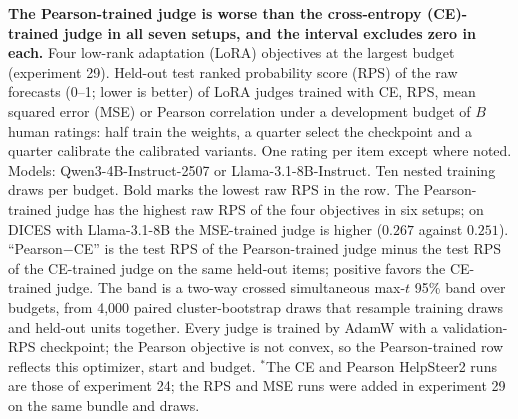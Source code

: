 \begin{table}[t]
\caption{\textbf{The Pearson-trained judge is worse than the cross-entropy (CE)-trained judge in all seven setups, and the interval excludes zero in each.}
Four low-rank adaptation (LoRA) objectives at the largest budget (experiment 29).
Held-out test ranked probability score (RPS) of the raw forecasts (0--1; lower is better) of LoRA judges trained with CE, RPS, mean squared error (MSE) or Pearson correlation under a development budget of $B$ human ratings: half train the weights, a quarter select the checkpoint and a quarter calibrate the calibrated variants. One rating per item except where noted. Models: Qwen3-4B-Instruct-2507 or Llama-3.1-8B-Instruct. Ten nested training draws per budget.
Bold marks the lowest raw RPS in the row.
The Pearson-trained judge has the highest raw RPS of the four objectives in six setups; on DICES with Llama-3.1-8B the MSE-trained judge is higher ($0.267$ against $0.251$).
``Pearson$-$CE'' is the test RPS of the Pearson-trained judge minus the test RPS of the CE-trained judge on the same held-out items; positive favors the CE-trained judge.
The band is a two-way crossed simultaneous max-$t$ 95\% band over budgets, from 4{,}000 paired cluster-bootstrap draws that resample training draws and held-out units together.
Every judge is trained by AdamW with a validation-RPS checkpoint; the Pearson objective is not convex, so the Pearson-trained row reflects this optimizer, start and budget.
$^{\ast}$The CE and Pearson HelpSteer2 runs are those of experiment 24; the RPS and MSE runs were added in experiment 29 on the same bundle and draws.}
\label{tab:exp29}
\centering\scriptsize

\end{table}

